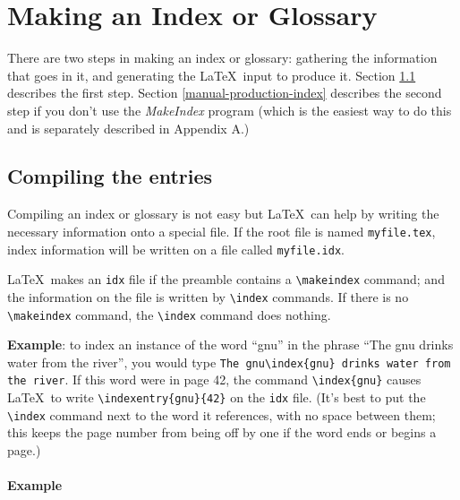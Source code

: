 \documentclass{article}
\newcommand{\justtext}[1]{\texttt{\textbackslash #1}}
\begin{document}
\section{Making an Index or Glossary}

There are two steps in making an index or glossary: gathering the information that goes in it, and
generating the \LaTeX\ input to produce it. Section \ref{compiling-entries} describes the first step.
Section \ref{manual-production-index} describes the second step if you don't use the 
\emph{MakeIndex} program (which is the easiest way to do this and is separately described in 
Appendix A.)

\subsection{Compiling the entries}\label{compiling-entries}

Compiling an index or glossary is not easy but \LaTeX\ can help by writing the necessary information 
onto a special file. If the root file is named {\tt myfile.tex}, index information will be written 
on a file called {\tt myfile.idx}. 

\LaTeX\ makes an {\tt idx} file if the preamble contains a \justtext{makeindex} command; and the 
information on the file is written by \justtext{index} commands. If there is no \justtext{makeindex} 
command, the \justtext{index} command does nothing.

\textbf{Example}: to index an instance of the word ``gnu'' in the phrase ``The gnu drinks water from
the river'', you would type {\tt The gnu\textbackslash index\{gnu\} drinks water from the river}. 
If this word were in page 42, the command \justtext{index\{gnu\}} causes \LaTeX\ to write
\justtext{indexentry\{gnu\}\{42\}} on the {\tt idx} file. 
(It's best to put the \justtext{index} command next to the word it references, with no space
between them; this keeps the page number from being off by one if the word ends or begins a
page.)


\paragraph{Example}
\end{document}

